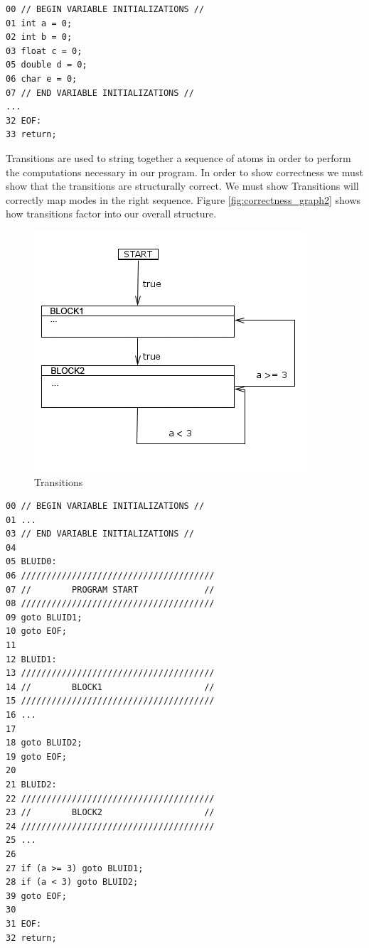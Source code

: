 \begin{lstlisting}[frame=single]
00 // BEGIN VARIABLE INITIALIZATIONS //
01 int a = 0;
02 int b = 0;
03 float c = 0;
05 double d = 0;
06 char e = 0;
07 // END VARIABLE INITIALIZATIONS //
...
32 EOF:
33 return;
\end{lstlisting}


\clearpage
Transitions are used to string together a sequence of atoms in order to perform the computations necessary in our program. In order to show correctness we must show that the transitions are structurally correct. We must show Transitions will correctly map modes in the right sequence. Figure \ref{fig:correctness_graph2} shows how transitions factor into our overall structure.

\begin{figure}[h]
	\centering
	\includegraphics[width=\imgmedphoto]{./images/correctness_ex_transition.png}
	\caption{Transitions}
	\label{fig:correctness_ex_transition}
\end{figure}

\begin{lstlisting}[frame=single]
00 // BEGIN VARIABLE INITIALIZATIONS //
01 ...
03 // END VARIABLE INITIALIZATIONS //
04
05 BLUID0:
06 //////////////////////////////////////
07 //        PROGRAM START             //
08 //////////////////////////////////////
09 goto BLUID1;
10 goto EOF;
11
12 BLUID1:
13 //////////////////////////////////////
14 //        BLOCK1                    //
15 //////////////////////////////////////
16 ...
17 
18 goto BLUID2;
19 goto EOF;
20
21 BLUID2:
22 //////////////////////////////////////
23 //        BLOCK2                    //
24 //////////////////////////////////////
25 ...
26
27 if (a >= 3) goto BLUID1;
28 if (a < 3) goto BLUID2;
39 goto EOF;
30
31 EOF:
32 return;
\end{lstlisting}

